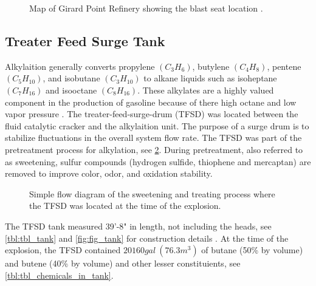 \documentclass[10pt,parskip=half,
toc=sectionentrywithdots,
bibliography=totocnumbered,
captions=tableheading,numbers=noendperiod]{scrartcl}
\begin{document}
\begin{figure}[H]
\hypertarget{fig:map}{%
\begin{center}
\end{center}
\caption{Map of Girard Point Refinery showing the blast seat location
\cite{Duchneskie2019}.}\label{fig:map}
}
\end{figure}

\hypertarget{treater-feed-surge-tank}{%
\subsection{Treater Feed Surge Tank}\label{treater-feed-surge-tank}}

Alkylaition generally converts propylene \((C_3H_6)\), butylene
\((C_4H_8)\), pentene \((C_5H_{10})\), and isobutane \((C_3H_{10})\) to
alkane liquids such as isoheptane \((C_7H_{16})\) and isooctane
\((C_8H_{16})\). These alkylates are a highly valued component in the
production of gasoline because of there high octane and low vapor
pressure \cite{flowserve2000}. The treater-feed-surge-drum (TFSD) was
located between the fluid catalytic cracker and the alkylaition unit.
The purpose of a surge drum is to stabilize fluctuations in the overall
system flow rate. The TFSD was part of the pretreatment process for
alkylation, see \cref{fig:fig_process_flow}. During pretreatment, also
referred to as sweetening, sulfur compounds (hydrogen sulfide, thiophene
and mercaptan) are removed to improve color, odor, and oxidation
stability.

\begin{figure}[H]
\hypertarget{fig:fig_process_flow}{%
\begin{center}
\end{center}
\caption{Simple flow diagram of the sweetening and treating process where the
TFSD was located at the time of the explosion.
\cite{Temur2014,Malone2019}}\label{fig:fig_process_flow}
}
\end{figure}

The TFSD tank measured 39'-8" in length, not including the heads, see
\cref{tbl:tbl_tank} and \cref{fig:fig_tank} for construction details
\cite{PES2019}. At the time of the explosion, the TFSD contained
\(20160gal\:(76.3m^3)\) of butane (50\% by volume) and butene (40\% by
volume) and other lesser constituients, see
\cref{tbl:tbl_chemicals_in_tank}.
\end{document}
